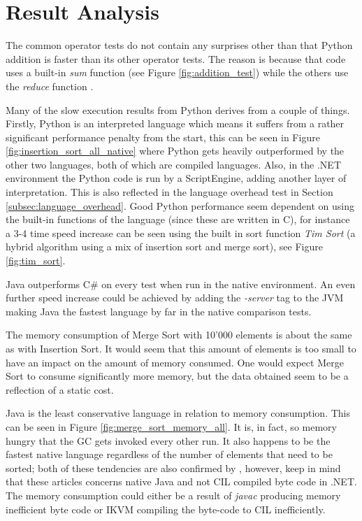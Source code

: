 \section{Result Analysis}

The common operator tests do not contain any surprises other than that Python addition is faster than its other operator tests. The reason is because that code uses a built-in \textit{sum} function \cite{PythonSum} (see Figure \ref{fig:addition_test}) while the others use the \textit{reduce} function \cite{PythonReduce}.

Many of the slow execution results from Python derives from a couple of things. Firstly, Python is an interpreted language which means it suffers from a rather significant performance penalty from the start, this can be seen in Figure \ref{fig:insertion_sort_all_native} where Python gets heavily outperformed by the other two languages, both of which are compiled languages. Also, in the .NET environment the Python code is run by a ScriptEngine, adding another layer of interpretation. This is also reflected in the language overhead test in Section \ref{subsec:language_overhead}. Good Python performance seem dependent on using the built-in functions of the language (since these are written in C), for instance a 3-4 time speed increase can be seen using the built in sort function \textit{Tim Sort} \cite{PythonSort} (a hybrid algorithm using a mix of insertion sort and merge sort), see Figure \ref{fig:tim_sort}.

Java outperforms C\# on every test when run in the native environment. An even further speed increase could be achieved by adding the \textit{-server} tag to the JVM making Java the fastest language by far in the native comparison tests.

The memory consumption of Merge Sort with 10'000 elements is about the same as with Insertion Sort. It would seem that this amount of elements is too small to have an impact on the amount of memory consumed. One would expect Merge Sort to consume significantly more memory, but the data obtained seem to be a reflection of a static cost.

Java is the least conservative language in relation to memory consumption. This can be seen in Figure \ref{fig:merge_sort_memory_all}. It is, in fact, so memory hungry that the GC gets invoked every other run. It also happens to be the fastest native language regardless of the number of elements that need to be sorted; both of these tendencies are also confirmed by \cite{Benchmark} \cite{Benchmark2}, however, keep in mind that these articles concerns native Java and not CIL compiled byte code in .NET. The memory consumption could either be a result of \textit{javac} producing memory inefficient byte code or IKVM compiling the byte-code to CIL inefficiently.

